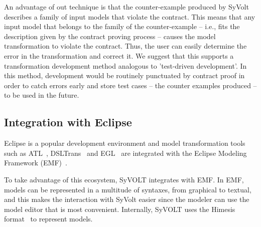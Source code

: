 An advantage of out technique is that the counter-example produced by SyVolt
describes a family of
input models that violate the contract.
This means that any input model that belongs to the family of the
counter-example -- i.e., fits the description given by the contract proving
process -- causes the model transformation to violate the contract.  Thus, the user can
easily determine the error in the transformation and correct it. We suggest that
this supports a transformation development method analogous to 'test-driven
development'. In this method, development would be routinely punctuated by
contract proof in order to catch errors early and store test cases -- the
counter examples produced -- to be used in the future.


\subsection{Integration with Eclipse}

 Eclipse is a popular development environment and model
transformation tools such as ATL~\cite{atlTool}, DSLTrans~\cite{Barroca2011} and
EGL~\cite{eglTool} are integrated with the Eclipse Modeling Framework
(EMF)~\cite{emfTool}.

To take advantage of this ecosystem, SyVOLT integrates with EMF.
In EMF, models can be represented in a multitude of syntaxes, from graphical
to textual, and this makes the interaction with SyVolt easier since the modeler
can use the model editor that is most convenient. Internally, SyVOLT uses 
the Himesis format~\cite{Provost2006} to represent models.



